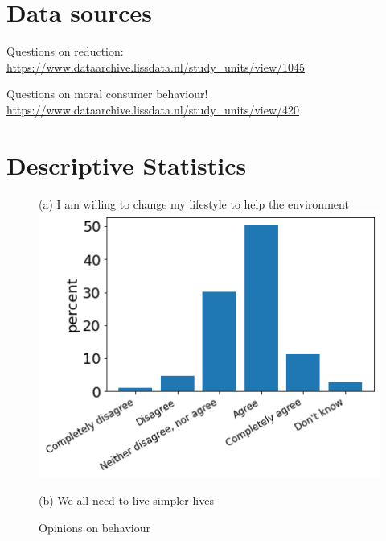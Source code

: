 \documentclass[12pt]{article}
\begin{document}
\section{Data sources}
Questions on reduction:
\url{https://www.dataarchive.lissdata.nl/study_units/view/1045}

Questions on moral consumer behaviour! 
\url{https://www.dataarchive.lissdata.nl/study_units/view/420}


\section{Descriptive Statistics}

\begin{figure}[h!!]
	\centering	
	\caption{Opinions on behaviour}\label{fig:opinions}	
	\begin{minipage}[h!!]{0.32\textwidth}  
		\centering\footnotesize{(a) I am willing to change my lifestyle to help the environment}
		\includegraphics[width=1\textwidth]{../codding_data/results/liss/qk20a175title0.png}
	\end{minipage}
	\begin{minipage}[h!!]{0.32\textwidth}
		\centering\footnotesize{(b) We all need to live simpler lives}

\end{minipage}
\end{figure}
\end{document}
